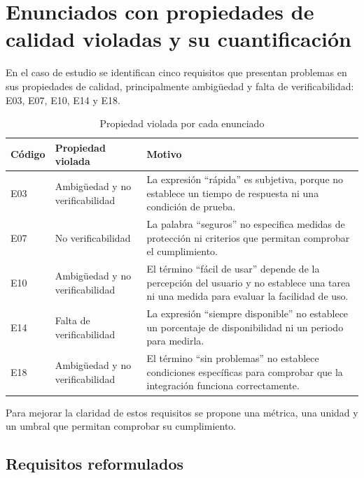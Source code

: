 \documentclass[12pt,a4paper,oneside]{article}
\begin{document}
\section{Enunciados con propiedades de calidad violadas y su cuantificación}

En el caso de estudio se identifican cinco requisitos que
presentan problemas en sus propiedades de calidad,
principalmente ambigüedad y falta de verificabilidad:
E03, E07, E10, E14 y E18. 

\begin{table}[htbp]
\centering
\caption{Propiedad violada por cada enunciado}
\label{tab:violaciones}
\small
\begin{tabular}{C{1.3cm} L{4.0cm} L{8.0cm}}
\toprule
\textbf{Código} & \textbf{Propiedad violada} & \textbf{Motivo} \\
\midrule
E03 & Ambigüedad y no verificabilidad &
La expresión ``rápida'' es subjetiva, porque no establece
un tiempo de respuesta ni una condición de prueba. \\

E07 & No verificabilidad &
La palabra ``seguros'' no especifica medidas de protección
ni criterios que permitan comprobar el cumplimiento. \\

E10 & Ambigüedad y no verificabilidad &
El término ``fácil de usar'' depende de la percepción
del usuario y no establece una tarea ni una medida para
evaluar la facilidad de uso. \\

E14 & Falta de verificabilidad &
La expresión ``siempre disponible'' no establece un porcentaje
de disponibilidad ni un periodo para medirla. \\

E18 & Ambigüedad y no verificabilidad &
El término ``sin problemas'' no establece condiciones
específicas para comprobar que la integración funciona
correctamente. \\
\bottomrule
\end{tabular}
\end{table}

Para mejorar la claridad de estos requisitos se propone
una métrica, una unidad y un umbral que permitan comprobar
su cumplimiento.

\subsection{Requisitos reformulados}
\end{document}
